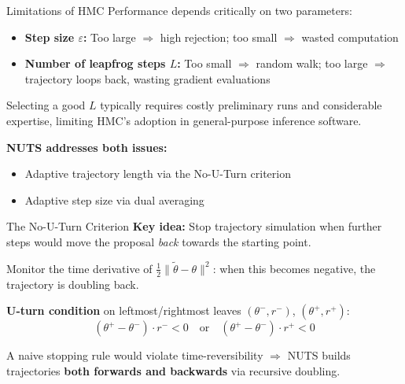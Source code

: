\documentclass{beamer}
\begin{document}
\begin{frame}{Limitations of HMC}
    Performance depends critically on two parameters:
    \begin{itemize}
        \item \textbf{Step size $\varepsilon$:} Too large $\Rightarrow$ high rejection; too small $\Rightarrow$ wasted computation
        \item \textbf{Number of leapfrog steps $L$:} Too small $\Rightarrow$ random walk; too large $\Rightarrow$ trajectory loops back, wasting gradient evaluations
    \end{itemize}

    \vspace{0.3cm}
    Selecting a good $L$ typically requires costly preliminary runs and considerable expertise, limiting HMC's adoption in general-purpose inference software.

    \vspace{0.3cm}
    \textbf{NUTS addresses both issues:}
    \begin{itemize}
        \item Adaptive trajectory length via the No-U-Turn criterion
        \item Adaptive step size via dual averaging \cite{nesterov2009primal}
    \end{itemize}
\end{frame}



\begin{frame}{The No-U-Turn Criterion}
    \textbf{Key idea:} Stop trajectory simulation when further steps would move the proposal \emph{back} towards the starting point.

    \vspace{0.3cm}
    Monitor the time derivative of $\frac{1}{2}\|\tilde{\theta} - \theta\|^2$: when this becomes negative, the trajectory is doubling back.

    \vspace{0.3cm}
    \textbf{U-turn condition} on leftmost/rightmost leaves $(\theta^-, r^-)$, $(\theta^+, r^+)$:
    \[
        (\theta^+ - \theta^-) \cdot r^- < 0 \quad \text{or} \quad (\theta^+ - \theta^-) \cdot r^+ < 0
    \]

    \vspace{0.2cm}
    A naive stopping rule would violate time-reversibility $\Rightarrow$ NUTS builds trajectories \textbf{both forwards and backwards} via recursive doubling.
\end{frame}
\end{document}
